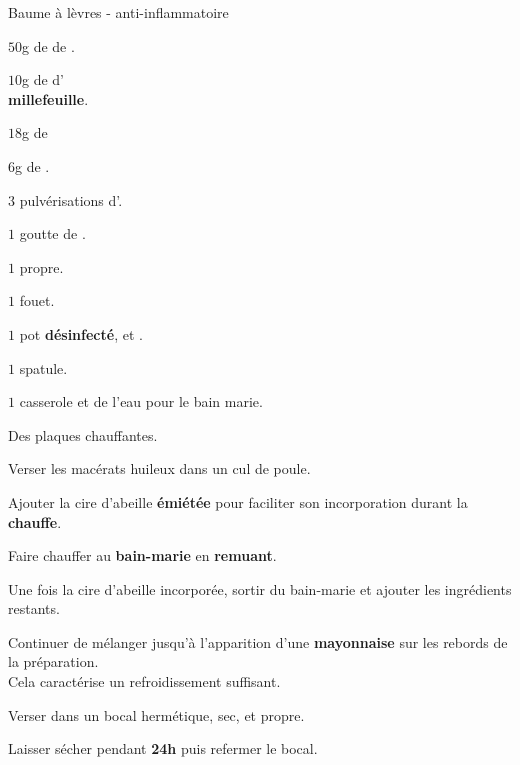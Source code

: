 \newcommand{\macerat}{\voc{macérat huileux}}
\newcommand{\macerats}{\voc{macérats huileux}}

\ficherecette
{%
    Baume à lèvres - anti-inflammatoire
}
{%
    \item $50$g de  de .
    \item $10$g de  d'\\\textbf{millefeuille}.
    \item $18$g de 
    \item $6$g de .
    \item $3$ pulvérisations d'.
    \item $1$ goutte de .
}
{%
    \item $1$  propre. 
    \item $1$ fouet. 
    \item $1$ pot \textbf{désinfecté},  et .
    \item $1$ spatule. 
    \item $1$ casserole et de l'eau pour le bain marie. 
    \item Des plaques chauffantes. 
}
{%
    \item Verser les macérats huileux dans un cul de poule. 
    \item Ajouter la cire d'abeille \textbf{émiétée} pour faciliter son incorporation durant la \textbf{chauffe}.
    \item Faire chauffer au \textbf{bain-marie} en \textbf{remuant}.
    \item Une fois la cire d'abeille incorporée, sortir du bain-marie et ajouter les ingrédients restants. 
    \item Continuer de mélanger jusqu'à l'apparition d'une \textbf{mayonnaise} sur les rebords de la préparation. \\
            Cela caractérise un refroidissement suffisant.
    \item Verser dans un bocal hermétique, sec, et propre. 
    \item Laisser sécher pendant \textbf{24h} puis refermer le bocal. 
}
